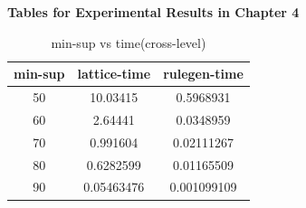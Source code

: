 \bf {Tables for Experimental Results in Chapter 4}
\begin{table}
  \centering
  \begin{tabular}{|c|c|c|}
     \hline

     min-sup & lattice-time	 & rulegen-time \\
     \hline
     50 & 10.03415 & 0.5968931 \\
     \hline
     60 & 2.64441 & 0.0348959 \\
     \hline
     70 & 0.991604 & 0.02111267 \\
     \hline
     80 & 0.6282599 & 0.01165509 \\
     \hline
     90 & 0.05463476 & 0.001099109 \\
     \hline
   \end{tabular}
  \caption{ min-sup vs time(cross-level)}\label{clmst}
\end{table}
